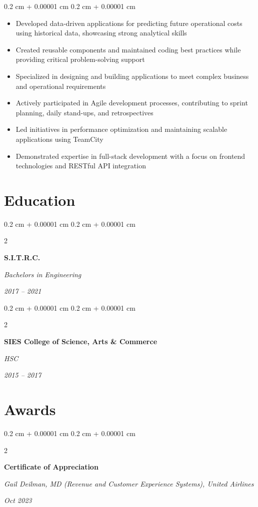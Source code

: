 \documentclass[10pt, letterpaper]{article}
\newenvironment{highlights}{
    \begin{itemize}[
        topsep=0.10 cm,
        parsep=0.10 cm,
        partopsep=0pt,
        itemsep=0pt,
        leftmargin=0.4 cm + 10pt
    ]
}{
    \end{itemize}
}
\newenvironment{onecolentry}{
    \begin{adjustwidth}{
        0.2 cm + 0.00001 cm
    }{
        0.2 cm + 0.00001 cm
    }
}{
    \end{adjustwidth}
}
\newenvironment{twocolentry}[2][]{
    \onecolentry
    \def\secondColumn{#2}
    \setcolumnwidth{\fill, 4.5 cm}
    \begin{paracol}{2}
}{
    \switchcolumn \raggedleft \secondColumn
    \end{paracol}
    \endonecolentry
}
\begin{document}
        \vspace{0.10 cm}
        \begin{onecolentry}
            \begin{highlights}
                \item Developed data-driven applications for predicting future operational costs using historical data, showcasing strong analytical skills
                \item Created reusable components and maintained coding best practices while providing critical problem-solving support
                \item Specialized in designing and building applications to meet complex business and operational requirements
                \item Actively participated in Agile development processes, contributing to sprint planning, daily stand-ups, and retrospectives
                \item Led initiatives in performance optimization and maintaining scalable applications using TeamCity
                \item Demonstrated expertise in full-stack development with a focus on frontend technologies and RESTful API integration
            \end{highlights}
        \end{onecolentry}

    \section{Education}
        \begin{twocolentry}{
        \textit{2017 – 2021}}
            \textbf{S.I.T.R.C.}
            
            \textit{Bachelors in Engineering}
        \end{twocolentry}

        \vspace{0.2 cm}

        \begin{twocolentry}{
        \textit{2015 – 2017}}
            \textbf{SIES College of Science, Arts \& Commerce}
            
            \textit{HSC}
        \end{twocolentry}

    \section{Awards}
        \begin{twocolentry}{
        \textit{Oct 2023}}
            \textbf{Certificate of Appreciation}
            
            \textit{Gail Deilman, MD (Revenue and Customer Experience Systems), United Airlines}
        \end{twocolentry}
\end{document}
